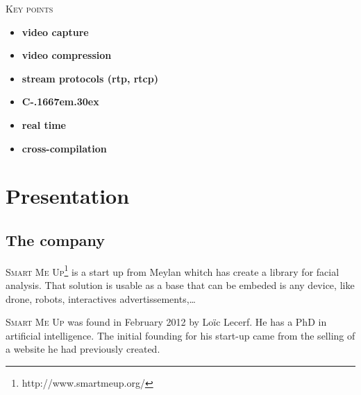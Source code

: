 \documentclass[a4paper,11pt]{custom}
\newcommand{\smu}{\textsc{Smart Me Up}}
\newcommand{\cpp}{%
  C\kern-.1667em\raise.30ex\hbox{\smaller{++}}%
  \spacefactor1000%
}
\begin{document}
\begin{center}
\textsc{\textsc{Key points}}
\end{center}

\begin{multicols}{2}
\begin{itemize}
\item \textbf{video capture}
\item \textbf{video compression}
\item \textbf{stream protocols (rtp, rtcp)}
\item \textbf{\cpp}
\item \textbf{real time}
\item \textbf{cross-compilation}
\end{itemize}
\end{multicols}

\newpage

%
\headerleftcontent{\headerlefttext}%
\headerrightcontent{\headerrighttext}%

\tableofcontents

\clearpage

\chapter{Presentation}


\section{The company}

\smu{}\footnote{http://www.smartmeup.org/} is a start up from Meylan whitch has create a library for facial
analysis. That solution is usable as a base that can be embeded is any device,
like drone, robots, interactives advertissements,…

\smu{} was found in February 2012 by Loïc Lecerf. He has a PhD in artificial
intelligence. The initial founding for his start-up came from the selling of
a website he had previously created.
\end{document}
